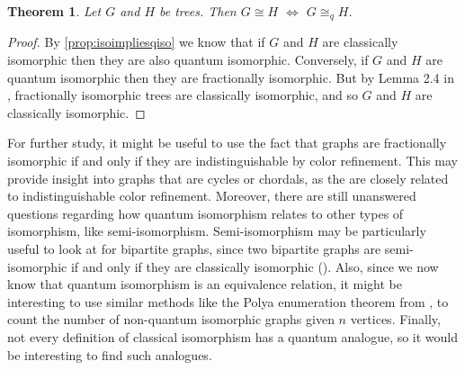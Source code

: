 \documentclass[12pt]{article}
\newtheorem{thm}{Theorem}[section]
\begin{document}
\begin{thm}
  \label{Trees}
  Let $G$ and $H$ be trees. Then $G \cong H$ $\Leftrightarrow$ $G
  \cong_q H$.
\end{thm}

\begin{proof}
By \cref{prop:isoimpliesqiso} we know that if $G$ and $H$ are
classically isomorphic then they are also quantum
isomorphic. Conversely, if $G$ and $H$ are quantum isomorphic then
they are fractionally isomorphic. But by Lemma 2.4 in
\cite{fractional}, fractionally isomorphic trees are classically
isomorphic, and so $G$ and $H$ are classically isomorphic.
\end{proof}

For further study, it might be useful to use the fact that graphs are
fractionally isomorphic if and only if they are indistinguishable by
color refinement. This may provide insight into graphs that are cycles
or chordals, as the are closely related to indistinguishable color
refinement. Moreover, there are still unanswered questions regarding
how quantum isomorphism relates to other types of isomorphism, like
semi-isomorphism. Semi-isomorphism may be particularly useful to look
at for bipartite graphs, since two bipartite graphs are
semi-isomorphic if and only if they are classically isomorphic
(\cite{fractional}).  Also, since we now know that quantum isomorphism
is an equivalence relation, it might be interesting to use similar
methods like the Polya enumeration theorem from \cite{comb}, to count
the number of non-quantum isomorphic graphs given $n$
vertices. Finally, not every definition of classical isomorphism has a
quantum analogue, so it would be interesting to find such analogues.



\end{document}
